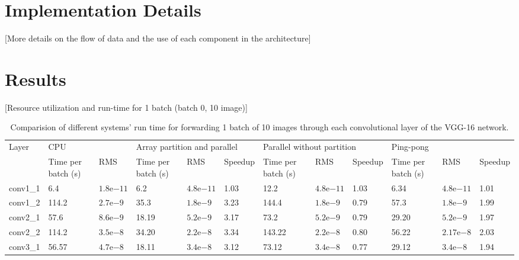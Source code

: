 \documentclass[conference]{IEEEtran}
\newcommand{\expnumber}[2]{{#1}\mathrm{e}{#2}}
\begin{document}
\section{Implementation Details}
[More details on the flow of data and the use of each component in the architecture]


\section{Results}
[Resource utilization and run-time for 1 batch (batch 0, 10 image)]
\begin{table*}[ht]
\caption{Comparision of different systems' run time for forwarding 1 batch of 10 images through each convolutional layer of the VGG-16 network.}
\centering
\begin{tabular}{| p{} | p{} | p{} | p{} | p{} | p{} | p{} | p{} | p{} | p{} | p{} | p{} |}
\hline
Layer & \multicolumn{2}{|p{0.10\textwidth}|}{CPU} & \multicolumn{3}{|p{0.151\textwidth}|}{Array partition and parallel} & \multicolumn{3}{|p{0.15\textwidth}|}{Parallel without partition} & \multicolumn{3}{|p{0.15\textwidth}|}{Ping-pong} \\
\cline{2-12}
	&	Time per batch (s)	& RMS  & Time per batch (s)	& RMS & Speedup & Time per batch (s)	& RMS & Speedup & Time per batch (s)	& RMS & Speedup \\
\hline 
conv1\_1 & 6.4 & $\expnumber{1.8}{-11}$ & 6.2 & $\expnumber{4.8}{-11}$ & 1.03  & 12.2 & $\expnumber{4.8}{-11}$ & 1.03 & 6.34 & $\expnumber{4.8}{-11}$ & 1.01 \\
\hline
conv1\_2 & 114.2 & $\expnumber{2.7}{-9}$ & 35.3 & $\expnumber{1.8}{-9}$ & 3.23  & 144.4 & $\expnumber{1.8}{-9}$ & 0.79 & 57.3 & $\expnumber{1.8}{-9}$ & 1.99 \\
\hline
conv2\_1 & 57.6 & $\expnumber{8.6}{-9}$ & 18.19 & $\expnumber{5.2}{-9}$ & 3.17  & 73.2 & $\expnumber{5.2}{-9}$ & 0.79 & 29.20 & $\expnumber{5.2}{-9}$ & 1.97 \\
\hline
conv2\_2 & 114.2 & $\expnumber{3.5}{-8}$ & 34.20 & $\expnumber{2.2}{-8}$ & 3.34  & 143.22 & $\expnumber{2.2}{-8}$ & 0.80 & 56.22 & $\expnumber{2.17}{-8}$ & 2.03 \\
\hline
conv3\_1 & 56.57 & $\expnumber{4.7}{-8}$ & 18.11 & $\expnumber{3.4}{-8}$ & 3.12  & 73.12 & $\expnumber{3.4}{-8}$ & 0.77 & 29.12 & $\expnumber{3.4}{-8}$ & 1.94 \\

\end{tabular}
\end{table*}
\end{document}
